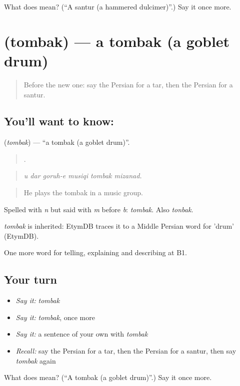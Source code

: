 \begin{tcolorbox}[breakable,colback=teal!4,colframe=teal!35!black,title={Before you move on}]
What does  mean? (\textquotedblleft{}A santur (a hammered dulcimer)\textquotedblright{}.) Say it once more.
\end{tcolorbox}
\section[\texorpdfstring{\fa{تنبک} (tombak)}{تنبک (tombak)}]{ (tombak) — a tombak (a goblet drum)}

\label{lesson:FA-C517-tombak}



\begin{quote}
Before the new one: say the Persian for a tar, then the Persian for a santur.
\end{quote}

\subsection*{You'll want to know: }
\textbf{} (\emph{tombak}) — \textquotedblleft{}a tombak (a goblet drum)\textquotedblright{}.

\begin{quote}
     .
\end{quote}

\begin{quote}
\emph{u dar goruh-e musiqi tombak mizanad.}
\end{quote}

\begin{quote}
He plays the tombak in a music group.
\end{quote}

Spelled with \emph{n} but said with \emph{m} before \emph{b}: \emph{tombak}. Also \emph{tonbak}.

\begin{cousinweb}
\emph{tombak} is inherited: EtymDB traces it to a Middle Persian word for 'drum' (EtymDB).
\end{cousinweb}

\begin{grammarlens}[title={What you've built}]
One more word for telling, explaining and describing at B1.
\end{grammarlens}

\subsection*{Your turn}
\begin{itemize}
\raggedright
  \item \emph{Say it:} \emph{tombak}
  \item \emph{Say it:} \emph{tombak}, once more
  \item \emph{Say it:} a sentence of your own with \emph{tombak}
  \item \emph{Recall:} say the Persian for a tar, then the Persian for a santur, then say \emph{tombak} again
\end{itemize}

\begin{tcolorbox}[breakable,colback=teal!4,colframe=teal!35!black,title={Before you move on}]
What does  mean? (\textquotedblleft{}A tombak (a goblet drum)\textquotedblright{}.) Say it once more.
\end{tcolorbox}
